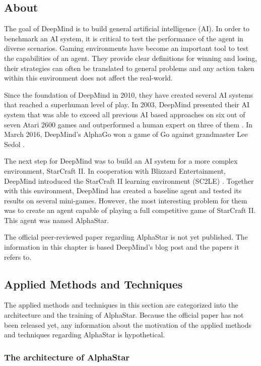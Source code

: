 \label{chapter:alphastar}

\subsection{About}
The goal of DeepMind is to build general artificial intelligence (AI). In order to benchmark an AI system, it is critical to test the performance of the agent in diverse scenarios. Gaming environments have become an important tool to test the capabilities of an agent. They provide clear definitions for winning and losing, their strategies can often be translated to general problems and any action taken within this environment does not affect the real-world.

Since the foundation of DeepMind in 2010, they have created several AI systems that reached a superhuman level of play. In 2003, DeepMind presented their AI system that was able to exceed all previous AI based approaches on six out of seven Atari 2600 games and outperformed a human expert on three of them \citep{mnih2013playing}. In March 2016, DeepMind’s AlphaGo won a game of Go against grandmaster Lee Sedol \citep{borowiec2016alphago}. 

The next step for DeepMind was to build an AI system for a more complex environment, StarCraft II. In cooperation with Blizzard Entertainment, DeepMind introduced the StarCraft II learning environment (SC2LE) \citep{vinyals2017starcraft}. Together with this environment, DeepMind has created a baseline agent and tested its results on several mini-games. However, the most interesting problem for them was to create an agent capable of playing a full competitive game of StarCraft II. This agent was named AlphaStar.

The official peer-reviewed paper regarding AlphaStar is not yet published. The information in this chapter is based DeepMind's blog post \citep{alphastarblog} and the papers it refers to. 

\subsection{Applied Methods and Techniques}
The applied methods and techniques in this section are categorized into the architecture and the training of AlphaStar. Because the official paper has not been released yet, any information about the motivation of the applied methods and techniques regarding AlphaStar is hypothetical. 

\subsubsection{The architecture of AlphaStar}~\\ 

